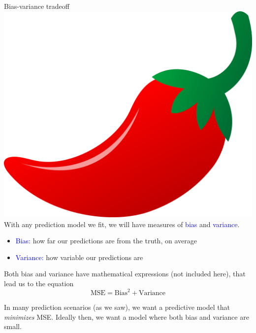 \documentclass[10pt,t]{beamer}
\begin{document}
\begin{frame}{Bias-variance tradeoff \includegraphics[scale=0.01]{figures/chilipepper.png}}
With any prediction model we fit, we will have measures of \textcolor{blue}{bias} and \textcolor{blue}{variance}.

\vspace{0.3cm}

\begin{itemize}
	\item \textcolor{blue}{Bias:} how far our predictions are from the truth, on average
	\item \textcolor{blue}{Variance:} how variable our predictions are
\end{itemize}

\vspace{0.3cm} 

Both bias and variance have mathematical expressions (not included here), that lead us to the equation
$$
\text{MSE} = \text{Bias}^2 + \text{Variance}
$$ \pause

In many prediction scenarios (as we saw), we want a predictive model that \textit{minimizes} MSE. Ideally then, we want a model where both bias and variance are small. 
\end{frame}
\end{document}
